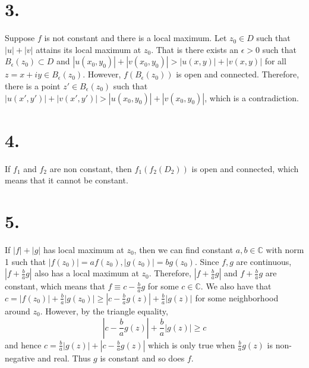 \documentclass[11pt]{article}
\begin{document}
\section*{3.}
Suppose $f$ is not constant and there is a local maximum. Let $z_0 \in D$ such that $|u|+|v|$ attains its local maximum at $z_0$. 
That is there exists an $\epsilon >0$ such that $B_\epsilon(z_0) \subset D$ and $|u(x_0,y_0)| + |v(x_0,y_0)| > |u(x,y)|+|v(x,y)|$ for all $z = x+iy \in B_\epsilon(z_0)$. 
However, $f(B_\epsilon(z_0))$ is open and connected. Therefore, there is a point $z' \in B_\epsilon(z_0)$ such that $|u(x',y')| + |v(x',y')| > |u(x_0,y_0)| + |v(x_0,y_0)|$, which is a contradiction.
\newpage
\section*{4.}
If $f_1$ and $f_2$ are non constant, then $f_1(f_2(D_2))$ is open and connected, which means that it cannot be constant. 
\newpage
\section*{5.}
If $|f|+|g|$ has local maximum at $z_0$, then we can find constant $a,b \in \mathbb{C}$ with norm 1 such that $|f(z_0)| = af(z_0), |g(z_0)| = bg(z_0)$. Since $f,g$ are continuous,
$\left|f + \frac{b}{a}g\right|$ also has a local maximum at $z_0$. Therefore, $\left| f + \frac{b}{a} g\right|$ and $f+ \frac{b}{a}g$ are constant, 
which means that $f \equiv c -\frac{b}{a}g$ for some $c \in \mathbb{C}$. 
We also have that $c = |f(z_0)| + \frac{b}{a}|g(z_0)| \ge |c - \frac{b}{a}g(z)| + \frac{b}{a}|g(z)|$ for some neighborhood around $z_0$. However, by the triangle equality, 
\[
    |c - \frac{b}{a}g(z)| + \frac{b}{a}|g(z)| \ge c    
\]
and hence $c = \frac{b}{a}|g(z)| + \left| c -\frac{b}{a}g(z)\right|$ which is only true when $\frac{b}{a}g(z)$ is non-negative and real. Thus $g$ is constant and so does $f$.
\end{document}
